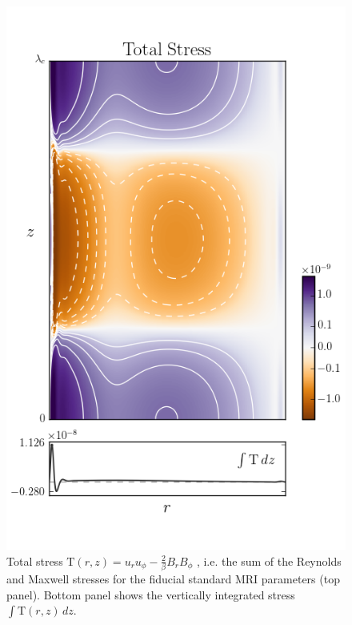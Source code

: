 \documentclass{emulateapj}
\begin{document}
\begin{figure}
\centering
\includegraphics[width=\columnwidth]{../figures/widegap_totalstress_intstress.png}
\caption{Total stress $\mathrm{T}(r, z) = u_r u_\phi - \frac{2}{\beta} B_r B_\phi$ , i.e. the sum of the Reynolds and Maxwell stresses for the fiducial standard MRI parameters (top panel). Bottom panel shows the vertically integrated stress $\int \mathrm{T}(r, z) \, dz$.}\label{fig:total_stress}
\end{figure}
\end{document}
